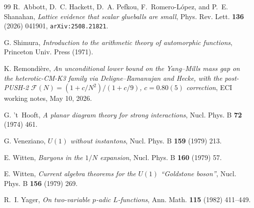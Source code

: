 \documentclass[11pt,a4paper]{amsart}
\theoremstyle{definition}
\begin{document}
\begin{thebibliography}{99}
R.~Abbott, D.~C. Hackett, D.~A. Pefkou, F.~Romero-López, and P.~E. Shanahan, \emph{Lattice evidence that scalar glueballs are small}, Phys. Rev. Lett. \textbf{136} (2026) 041901, \texttt{arXiv:2508.21821}.

G. Shimura, \emph{Introduction to the arithmetic theory of automorphic functions}, Princeton Univ. Press (1971).

K. Remondière, \emph{An unconditional lower bound on the Yang--Mills mass gap on the heterotic-CM-K3 family via Deligne--Ramanujan and Hecke, with the post-PUSH-2 $\mathcal{F}(N) = (1 + c/N^{2})/(1 + c/9)$, $c = 0.80(5)$ correction}, ECI working notes, May 10, 2026.

G. 't~Hooft, \emph{A planar diagram theory for strong interactions}, Nucl. Phys. B \textbf{72} (1974) 461.

G. Veneziano, \emph{$U(1)$ without instantons}, Nucl. Phys. B \textbf{159} (1979) 213.

E. Witten, \emph{Baryons in the $1/N$ expansion}, Nucl. Phys. B \textbf{160} (1979) 57.

E. Witten, \emph{Current algebra theorems for the $U(1)$ ``Goldstone boson''}, Nucl. Phys. B \textbf{156} (1979) 269.

R.~I. Yager, \emph{On two-variable $p$-adic $L$-functions}, Ann. Math. \textbf{115} (1982) 411--449.

\end{thebibliography}
\end{document}
